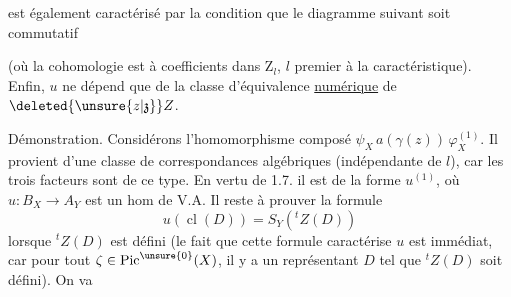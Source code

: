 est également caractérisé par la condition que le diagramme suivant soit commutatif


(où la cohomologie est à coefficients dans $\mathrm{Z}_l$, $l$ premier à la caractéristique). Enfin, $u$ ne dépend que de la classe d'équivalence \uline{numérique} de $\deleted{\unsure{z|\mathfrak{z}}}Z$.

Démonstration. Considérons l'homomorphisme composé $\psi_X\,a(\gamma(z))\,\varphi_X^{(1)}$. Il provient d'une classe de  correspondances algébriques (indépendante de $l$), car les trois facteurs sont de ce type. En vertu de 1.7. il est de la forme $u^{(1)}$, où $u:B_X\longrightarrow A_Y$ est un hom de V.A. Il reste à prouver la formule
\[
u(\operatorname{cl}(D))=S_Y({}^tZ(D))
\]
lorsque $ {}^tZ(D)$ est défini (le fait que cette formule caractérise $u$ est immédiat, car pour tout $\zeta\in\operatorname{Pic}^{\unsure{0}}(X)$, il y a un représentant $D$ tel que $ {}^tZ(D)$ soit défini). On va

